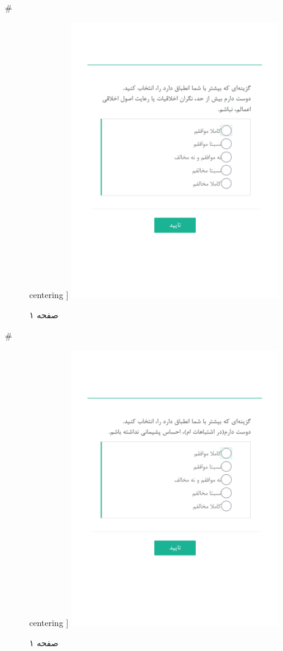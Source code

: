 { 
 # 
\begin{figure}[htpb]
centering ]
\includegraphics[width=0.8\textwidth]{./img/Task30.png/}
\caption{صفحه ۱}
\label{fig:Task1}
\end{figure}
 
 
 # 
\begin{figure}[htpb]
centering ]
\includegraphics[width=0.8\textwidth]{./img/Task31.png/}
\caption{صفحه ۱}
\label{fig:Task1}
\end{figure}
 
}
